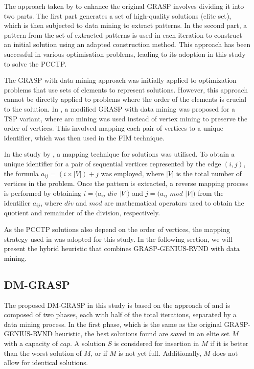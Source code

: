 \documentclass{singlecol-new}
\begin{document}
The approach taken by \citet{ribeiro2006hybridization} to enhance the original GRASP involves dividing it into two parts. The first part generates a set of high-quality solutions (elite set), which is then subjected to data mining to extract patterns. In the second part, a pattern from the set of extracted patterns is used in each iteration to construct an initial solution using an adapted construction method. This approach has been successful in various optimisation problems, leading to its adoption in this study to solve the PCCTP.

The GRASP with data mining approach was initially applied to optimization problems that use sets of elements to represent solutions. However, this approach cannot be directly applied to problems where the order of the elements is crucial to the solution. In \citet{guerine14}, a modified GRASP with data mining was proposed for a TSP variant, where arc mining was used instead of vertex mining to preserve the order of vertices. This involved mapping each pair of vertices to a unique identifier, which was then used in the FIM technique.


In the study by \citet{guerine14}, a mapping technique for solutions was utilised. To obtain a unique identifier for a pair of sequential vertices represented by the edge $(i,j)$, the formula $a_{ij} = (i \times | V |) + j$ was employed, where $|V|$ is the total number of vertices in the problem. Once the pattern is extracted, a reverse mapping process is performed by obtaining $i = (a_{ij}$ $div$ $|V|)$ and $j = (a_{ij}$ $mod$ $|V|)$ from the identifier $a_{ij}$, where $div$ and $mod$ are mathematical operators used to obtain the quotient and remainder of the division, respectively.

As the PCCTP solutions also depend on the order of vertices, the mapping strategy used in \citet{guerine14} was adopted for this study. In the following section, we will present the hybrid heuristic that combines GRASP-GENIUS-RVND with data mining.

\subsection{DM-GRASP}

The proposed DM-GRASP in this study is based on the approach of \citet{guerine14} and is composed of two phases, each with half of the total iterations, separated by a data mining process. In the first phase, which is the same as the original GRASP-GENIUS-RVND heuristic, the best solutions found are saved in an elite set $M$ with a capacity of $cap$. A solution $S$ is considered for insertion in $M$ if it is better than the worst solution of $M$, or if $M$ is not yet full. Additionally, $M$ does not allow for identical solutions.
\end{document}

